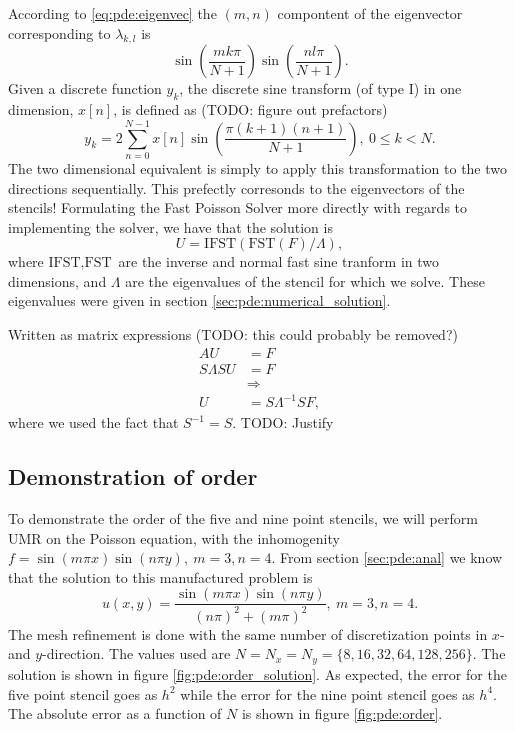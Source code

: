 According to \eqref{eq:pde:eigenvec} the $(m, n)$ compontent of the eigenvector corresponding to $\lambda_{k,l}$ is
$$
\sin\left( \frac{m k \pi}{N + 1} \right)
\sin\left( \frac{n l \pi}{N + 1} \right).
$$
Given a discrete function $y_k$, the discrete sine transform (of type I) in one dimension, $x[n]$, is defined as\cite{scipy_dst} (TODO: figure out prefactors)
$$
y_k =
2 \sum_{n=0}^{N-1}
x[n]
\sin\left(
\frac{
  \pi (k+1) (n+1)
}{
  N + 1
}
\right), ~0 \leq k < N.
$$
The two dimensional equivalent is simply to apply this transformation to the two directions sequentially.
This prefectly corresonds to the eigenvectors of the stencils!
Formulating the Fast Poisson Solver more directly with regards to implementing the solver, we have that the solution is
$$
U = \text{IFST}(\text{FST}(F) / \Lambda),
$$
where $\text{IFST}, \text{FST}$ are the inverse and normal fast sine tranform in two dimensions, and $\Lambda$ are the eigenvalues of the stencil for which we solve.
These eigenvalues were given in section \ref{sec:pde:numerical_solution}.


Written as matrix expressions
(TODO: this could probably be removed?)
\begin{align*}
  A U &= F\\
  S\Lambda S U &= F\\
  &\Rightarrow\\
  U &= S\Lambda^{-1} S F,
\end{align*}
where we used the fact that $S^{-1} = S$. TODO: Justify 
\subsection{Demonstration of order}
To demonstrate the order of the five and nine point stencils, we will perform UMR on the Poisson equation, with the inhomogenity $f = \sin(m \pi x)\sin(n \pi y), ~m=3, n=4$.
From section \ref{sec:pde:anal} we know that the solution to this manufactured problem is
$$
u(x, y) =
\frac{
  \sin(m \pi x)\sin(n \pi y)
}{
  (n\pi)^2 + (m\pi)^2
}
, ~m=3, n=4.
$$
The mesh refinement is done with the same number of discretization points in $x$- and $y$-direction.
The values used are $N = N_x = N_y = \{8, 16, 32, 64, 128, 256\}$.
The solution is shown in figure \ref{fig:pde:order_solution}.
As expected, the error for the five point stencil goes as $h^2$ while the error for the nine point stencil goes as $h^4$.
The absolute error as a function of $N$ is shown in figure \ref{fig:pde:order}.

